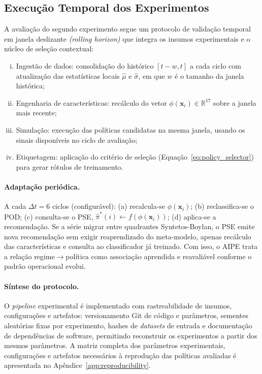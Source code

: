 \subsection{Execução Temporal dos Experimentos}

A avaliação do segundo experimento segue um protocolo de validação temporal em janela deslizante \textit{(rolling horizon)} que integra os insumos experimentais e o núcleo de seleção contextual:

\begin{enumerate}[(i)]
  \item Ingestão de dados: consolidação do histórico $[t-w, t]$ a cada ciclo com atualização das estatísticas locais $\hat{\mu}$ e $\hat{\sigma}$, em que $w$ é o tamanho da janela histórica;
  \item Engenharia de características: recálculo do vetor $\phi(\mathbf{x}_i) \in \mathbb{R}^{17}$ sobre a janela mais recente;
  \item Simulação: execução das políticas candidatas na mesma janela, usando os sinais disponíveis no ciclo de avaliação;
  \item Etiquetagem: aplicação do critério de seleção (Equação~\ref{eq:policy_selector}) para gerar rótulos de treinamento.
\end{enumerate}

\paragraph{Adaptação periódica.} A cada $\Delta t = 6$ ciclos (configurável): (a) recalcula-se $\phi(\mathbf{x}_i)$; (b) reclassifica-se o POD; (c) consulta-se o PSE, $\hat{\pi}^*(i) \leftarrow f(\phi(\mathbf{x}_i))$; (d) aplica-se a recomendação. Se a série migrar entre quadrantes Syntetos-Boylan, o PSE emite nova recomendação sem exigir reaprendizado do meta-modelo, apenas recálculo das características e consulta ao classificador já treinado. Com isso, o AIPE trata a relação regime$\rightarrow$política como associação aprendida e reavaliável conforme o padrão operacional evolui.

\paragraph{Síntese do protocolo.} O \textit{pipeline} experimental é implementado com rastreabilidade de insumos, configurações e artefatos: versionamento Git de código e parâmetros, sementes aleatórias fixas por experimento, hashes de \textit{datasets} de entrada e documentação de dependências de software, permitindo reconstruir os experimentos a partir dos mesmos parâmetros. A matriz completa dos parâmetros experimentais, configurações e artefatos necessários à reprodução das políticas avaliadas é apresentada no Apêndice~\ref{app:reproducibility}.

